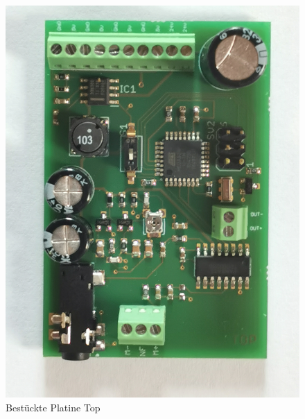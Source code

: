 \begin{center}
	\begin{minipage}[t]{0.475\linewidth}
		\begin{figure}[H]
			\centering
			\includegraphics[width=\textwidth]{images/projektergebnis/platineV1top.jpg}
			\caption{Bestückte Platine Top}
		\end{figure}
	\end{minipage}
	\begin{minipage}[t]{0.475\linewidth}
		\begin{figure}[H]
			\centering

\end{figure}
\end{minipage}
\end{center}

